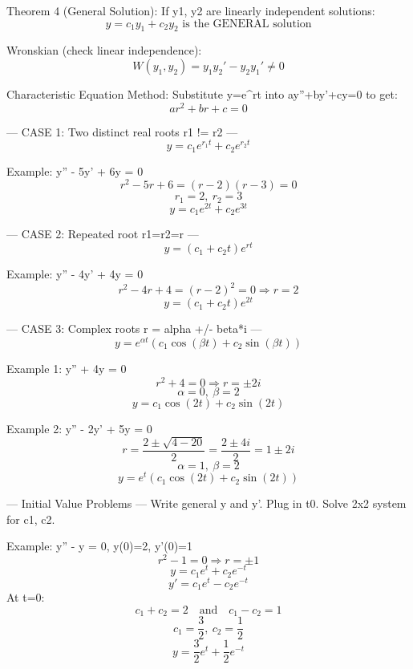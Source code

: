 Theorem 4 (General Solution):
If y1, y2 are linearly independent solutions:
$$y = c_1y_1 + c_2y_2 \text{ is the GENERAL solution}$$

Wronskian (check linear independence):
$$W(y_1,y_2) = y_1y_2' - y_2y_1' \neq 0$$

Characteristic Equation Method:
Substitute y=e^{rt} into ay''+by'+cy=0 to get:
$$ar^2 + br + c = 0$$

--- CASE 1: Two distinct real roots r1 != r2 ---
$$y = c_1e^{r_1 t} + c_2e^{r_2 t}$$

Example: y'' - 5y' + 6y = 0
$$r^2 - 5r + 6 = (r-2)(r-3) = 0$$
$$r_1=2,\ r_2=3$$
$$y = c_1e^{2t} + c_2e^{3t}$$

--- CASE 2: Repeated root r1=r2=r ---
$$y = (c_1 + c_2t)e^{rt}$$

Example: y'' - 4y' + 4y = 0
$$r^2 - 4r + 4 = (r-2)^2 = 0 \Rightarrow r=2$$
$$y = (c_1 + c_2t)e^{2t}$$

--- CASE 3: Complex roots r = alpha +/- beta*i ---
$$y = e^{\alpha t}(c_1\cos(\beta t) + c_2\sin(\beta t))$$

Example 1: y'' + 4y = 0
$$r^2 + 4 = 0 \Rightarrow r = \pm 2i$$
$$\alpha=0,\ \beta=2$$
$$y = c_1\cos(2t) + c_2\sin(2t)$$

Example 2: y'' - 2y' + 5y = 0
$$r = \frac{2 \pm \sqrt{4-20}}{2} = \frac{2 \pm 4i}{2} = 1 \pm 2i$$
$$\alpha=1,\ \beta=2$$
$$y = e^{t}(c_1\cos(2t) + c_2\sin(2t))$$

--- Initial Value Problems ---
Write general y and y'. Plug in t0. Solve 2x2 system for c1, c2.

Example: y'' - y = 0, y(0)=2, y'(0)=1
$$r^2 - 1 = 0 \Rightarrow r = \pm 1$$
$$y = c_1e^{t} + c_2e^{-t}$$
$$y' = c_1e^{t} - c_2e^{-t}$$
At t=0:
$$c_1 + c_2 = 2 \quad \text{and} \quad c_1 - c_2 = 1$$
$$c_1 = \frac{3}{2},\ c_2 = \frac{1}{2}$$
$$y = \frac{3}{2}e^{t} + \frac{1}{2}e^{-t}$$
